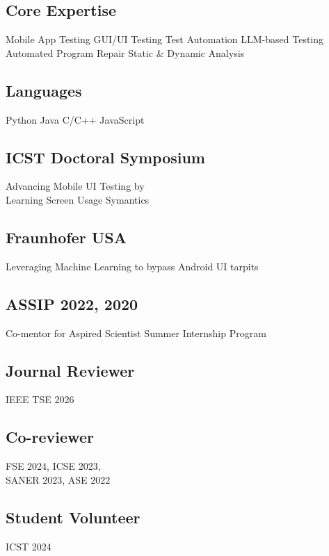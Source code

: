 \documentclass[a4paper]{MagicalCV}
\renewcommand{\sectionsep}{\vspace{2pt}}
\begin{document}
\begin{minipage}[t]{0.30\textwidth}
\subsection{Core Expertise}
Mobile App Testing \textbullet{} GUI/UI Testing \textbullet{} Test Automation \textbullet{} LLM-based Testing \textbullet{} Automated Program Repair \textbullet{} Static \& Dynamic Analysis

\subsection{Languages}
Python \textbullet{} Java \textbullet{} C/C++ \textbullet{} JavaScript
\sectionsep \\
\subsection{ICST Doctoral Symposium}
Advancing Mobile UI Testing by \\ Learning Screen Usage Symantics \\
\vspace{\topsep}
\sectionsep
\subsection{Fraunhofer USA}
Leveraging Machine Learning to bypass Android UI tarpits
\sectionsep \\
\subsection{ASSIP 2022, 2020}
Co-mentor for Aspired Scientist Summer Internship Program

\subsection{Journal Reviewer}
IEEE TSE 2026
\subsection{Co-reviewer}
FSE 2024, ICSE 2023, \\SANER 2023, ASE 2022
\subsection{Student Volunteer}
ICST 2024

\sectionsep
\end{minipage}
\end{document}
